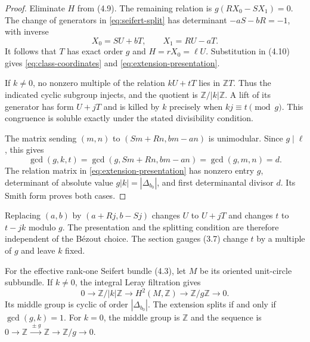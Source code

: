 \begin{proof}
Eliminate $H$ from (4.9).  The remaining relation is
$g(RX_0-SX_1)=0$.  The change of generators in
\eqref{eq:seifert-split} has determinant $-aS-bR=-1$, with inverse
\[
             X_0=SU+bT,\qquad X_1=RU-aT.
\]
It follows that $T$ has exact order $g$ and $H=rX_0=\ell U$.
Substitution in (4.10) gives \eqref{eq:class-coordinates} and
\eqref{eq:extension-presentation}.

If $k\ne0$, no nonzero multiple of the relation $kU+tT$ lies in
$\mathbb ZT$.  Thus the indicated cyclic subgroup injects, and the
quotient is $\mathbb Z/|k|\mathbb Z$.  A lift of its generator has
form $U+jT$ and is killed by $k$ precisely when
$kj\equiv t\pmod g$.  This congruence is soluble exactly under the
stated divisibility condition.

The matrix sending $(m,n)$ to $(Sm+Rn,bm-an)$ is unimodular.
Since $g\mid\ell$, this gives
\[
 \gcd(g,k,t)=\gcd(g,Sm+Rn,bm-an)=\gcd(g,m,n)=d.
\]
The relation matrix in \eqref{eq:extension-presentation} has nonzero
entry $g$, determinant of absolute value $g|k|=|\Delta_{b_0}|$,
and first determinantal divisor $d$.  Its Smith form proves both cases.
\end{proof}

Replacing $(a,b)$ by $(a+Rj,b-Sj)$ changes $U$ to $U+jT$ and changes
$t$ to $t-jk$ modulo $g$.  The presentation and the splitting condition
are therefore independent of the B\'ezout choice.
The section gauges (3.7) change $t$ by a multiple of $g$ and leave $k$ fixed.

\begin{proposition}\label{prop:leray-extension}
For the effective rank-one Seifert bundle (4.3), let $M$ be its oriented
unit-circle subbundle.  If $k\ne0$, the integral Leray filtration gives
\begin{equation}\label{eq:leray-extension}
 0\longrightarrow\mathbb Z/|k|\mathbb Z
 \longrightarrow H^2(M,\mathbb Z)
 \longrightarrow\mathbb Z/g\mathbb Z\longrightarrow0.
\end{equation}
Its middle group is cyclic of order $|\Delta_{b_0}|$.
The extension splits if and only if $\gcd(g,k)=1$.
For $k=0$, the middle group is $\mathbb Z$ and the sequence is
$0\to\mathbb Z\xrightarrow{\,\pm g\,}\mathbb Z\to\mathbb Z/g\to0$.
\end{proposition}

